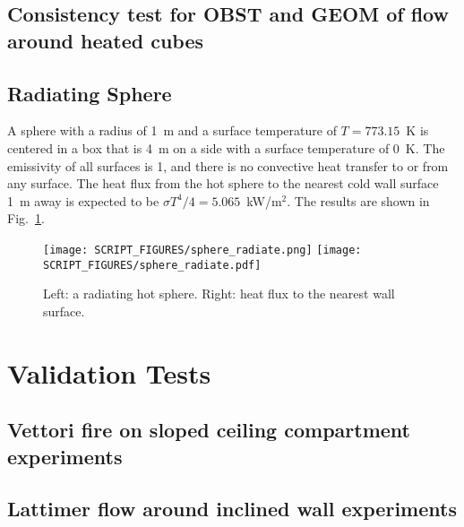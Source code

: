 \documentclass[12pt]{article}
\begin{document}
\subsection{Consistency test for OBST and GEOM of flow around heated cubes}


\subsection{Radiating Sphere}
\label{sphere_radiate}

A sphere with a radius of 1~m and a surface temperature of $T=773.15$~K is centered in a box that is 4~m on a side with a surface temperature of 0~K. The emissivity of all surfaces is 1, and there is no convective heat transfer to or from any surface. The heat flux from the hot sphere to the nearest cold wall surface 1~m away is expected to be $\sigma T^4/4=5.065$~kW/m$^2$. The results are shown in Fig.~\ref{sphere_radiate_fig}.
\begin{figure}[ht]
\texttt{[image: SCRIPT\_FIGURES/sphere\_radiate.png]}
\texttt{[image: SCRIPT\_FIGURES/sphere\_radiate.pdf]}
\caption[The {\ct sphere\_radiate} test case]{Left: a radiating hot sphere. Right: heat flux to the nearest wall surface.}
\label{sphere_radiate_fig}
\end{figure}





\clearpage

\section{Validation Tests}

\subsection{Vettori fire on sloped ceiling compartment experiments}





\subsection{Lattimer flow around inclined wall experiments}
\end{document}
